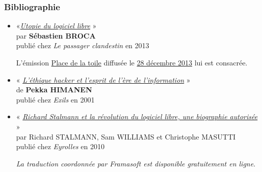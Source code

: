 \documentclass[10pt]{beamer}
\begin{document}
\begin{frame}
  \frametitle{Bibliographie}

  \begin{itemize}
  \item
    «\emph{\href{http://lepassagerclandestin.fr/catalogue/essais/utopie-du-logiciel-libre.html}{Utopie du logiciel libre}} » \hfill
    \\
    par \textbf{Sébastien BROCA} \\
    publié chez \emph{Le passager clandestin} en 2013

    {\small\slshape

      L'émission \href{http://www.franceculture.fr/emission-place-de-la-toile-politique-du-logiciel-libre-2013-12-28}{Place de la toile} diffusée le \href{http://rf.proxycast.org/841402162318675968/10465-28.12.2013-ITEMA_20567547-0.mp3}{28 décembre 2013} lui est consacrée.}

    \vfill

  \item « \emph{\href{http://www.amazon.fr/LEthique-Hacker-lEsprit-l\%C3\%A8re-linformation/dp/2912969298}{L'éthique hacker et l'esprit de l'ère de l'information}} »\\
    de \textbf{Pekka HIMANEN}\\
    publié chez \emph{Exils} en 2001

    \vfill

  \item « \emph{\href{http://framabook.org/richard-stallman-et-la-revolution-du-logiciel-libre}{Richard Stalmann et la révolution du logiciel libre, une biographie autorisée}} »\\
    par Richard STALMANN, Sam WILLIAMS et Christophe MASUTTI\\
    publié chez \emph{Eyrolles} en 2010

    {\small\slshape La traduction coordonnée par Framasoft est disponible gratuitement en ligne}.

  \end{itemize}
\end{frame}

\end{document}
